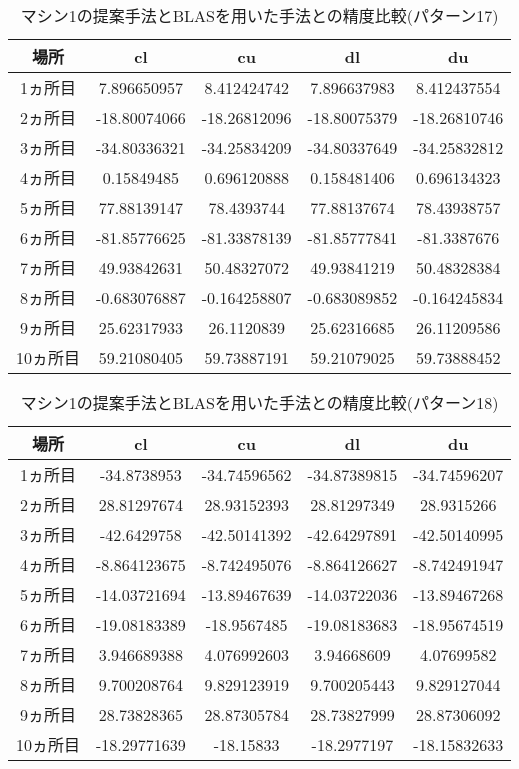 \documentclass[11pt,a4paper]{jsreport}
\theoremstyle{definition}
\begin{document}
\begin{table}[H]
\centering
\begin{tabular}{|c|c|c|c|c|}
\hline
場所 & cl & cu & dl & du \\ \hline
1ヵ所目 & 7.896650957 & 8.412424742 & 7.896637983 & 8.412437554 \\ \hline
2ヵ所目 & -18.80074066 & -18.26812096 & -18.80075379 & -18.26810746 \\ \hline
3ヵ所目 & -34.80336321 & -34.25834209 & -34.80337649 & -34.25832812 \\ \hline
4ヵ所目 & 0.15849485 & 0.696120888 & 0.158481406 & 0.696134323 \\ \hline
5ヵ所目 & 77.88139147 & 78.4393744 & 77.88137674 & 78.43938757 \\ \hline
6ヵ所目 & -81.85776625 & -81.33878139 & -81.85777841 & -81.3387676 \\ \hline
7ヵ所目 & 49.93842631 & 50.48327072 & 49.93841219 & 50.48328384 \\ \hline
8ヵ所目 & -0.683076887 & -0.164258807 & -0.683089852 & -0.164245834 \\ \hline
9ヵ所目 & 25.62317933 & 26.1120839 & 25.62316685 & 26.11209586 \\ \hline
10ヵ所目 & 59.21080405 & 59.73887191 & 59.21079025 & 59.73888452 \\ \hline
\end{tabular}
\caption{マシン1の提案手法とBLASを用いた手法との精度比較(パターン17)}
\end{table}

\begin{table}[H]
\centering
\begin{tabular}{|c|c|c|c|c|}
\hline
場所 & cl & cu & dl & du \\ \hline
1ヵ所目 & -34.8738953 & -34.74596562 & -34.87389815 & -34.74596207 \\ \hline
2ヵ所目 & 28.81297674 & 28.93152393 & 28.81297349 & 28.9315266 \\ \hline
3ヵ所目 & -42.6429758 & -42.50141392 & -42.64297891 & -42.50140995 \\ \hline
4ヵ所目 & -8.864123675 & -8.742495076 & -8.864126627 & -8.742491947 \\ \hline
5ヵ所目 & -14.03721694 & -13.89467639 & -14.03722036 & -13.89467268 \\ \hline
6ヵ所目 & -19.08183389 & -18.9567485 & -19.08183683 & -18.95674519 \\ \hline
7ヵ所目 & 3.946689388 & 4.076992603 & 3.94668609 & 4.07699582 \\ \hline
8ヵ所目 & 9.700208764 & 9.829123919 & 9.700205443 & 9.829127044 \\ \hline
9ヵ所目 & 28.73828365 & 28.87305784 & 28.73827999 & 28.87306092 \\ \hline
10ヵ所目 & -18.29771639 & -18.15833 & -18.2977197 & -18.15832633 \\ \hline
\end{tabular}
\caption{マシン1の提案手法とBLASを用いた手法との精度比較(パターン18)}
\end{table}
\end{document}
